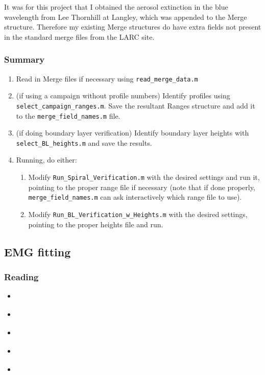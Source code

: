 \documentclass[12pt]{article}
\begin{document}
		It was for this project that I obtained the aerosol extinction in the blue wavelength from Lee Thornhill at Langley, which was appended to the Merge structure. Therefore my existing Merge structures do have extra fields not present in the standard merge files from the LARC site.
		
		\subsubsection{Summary}		
		\begin{enumerate}
		\item Read in Merge files if necessary using \lstinline$read_merge_data.m$
		
		\item (if using a campaign without profile numbers) Identify profiles using \lstinline$select_campaign_ranges.m$. Save the resultant Ranges structure and add it to the \lstinline$merge_field_names.m$ file.
		
		\item (if doing boundary layer verification) Identify boundary layer heights with \lstinline$select_BL_heights.m$ and save the results.
		
		\item Running, do either:
			\begin{enumerate}
			\item Modify \lstinline$Run_Spiral_Verification.m$ with the desired settings and run it, pointing to the proper range file if necessary (note that if done properly, \lstinline$merge_field_names.m$ can ask interactively which range file to use).
			\item Modify \lstinline$Run_BL_Verification_w_Heights.m$ with the desired settings, pointing to the proper heights file and run.
			\end{enumerate}
		\end{enumerate}
	
	
	\subsection{EMG fitting}
		\subsubsection{Reading}
		\begin{itemize}
		\item \citealt{beirle11}
		\item \citealt{valin13}
		\item \citealt{deFoy14}
		\item \citealt{lu15}
		\item \citealt{laughner16}
		\end{itemize}
		
\end{document}
